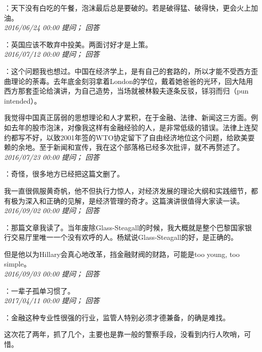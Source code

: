 \documentclass[twocolumn]{ctexart}
\begin{document}
：天下没有白吃的午餐，泡沫最后总是要破的。若是破得猛、破得快，更会火上加油。\\

\textit{\hfill\noindent\small 2016/06/24 00:00 提问； 回答}

：英国应该不敢弃中投美。两面讨好才是上策。\\

\textit{\hfill\noindent\small 2016/07/12 00:00 提问； 回答}

：这个问题我也想过。中国在经济学上，是有自己的套路的，所以才能不受西方歪曲理论的荼毒。去年底金刻羽拿着London的学位，戴着她爸爸的光环，回大陆用西方那套歪论给演讲，为自己造势，当场就被林毅夫逐条反驳，铩羽而归（pun intended）。

我觉得中国真正孱弱的思想理论和人才累积，在于金融、法律、新闻这三方面。例如去年的股市泡沫，对像我这样有金融经验的人，是非常低级的错误。法律上连契约都写不好，以致2001年签的WTO协定留下了自由经济地位这个问题，给欧美耍赖的余地。至于新闻和宣传，我在这个部落格已经多次批评，就不再赘述了。\\

\textit{\hfill\noindent\small 2016/07/23 00:00 提问； 回答}

：奇怪，很多地方已经把这篇文删了。

我一直很佩服黄奇帆，他不但执行力惊人，对经济发展的理论大纲和实践细节，都有极为深入和正确的见解，是经济管理的奇才。这篇演讲很值得大家读一读。\\

\textit{\hfill\noindent\small 2016/09/02 00:00 提问； 回答}

：那篇文章我读了。当年废除Glass-Steagall的时候，我大概就是整个巴黎国家银行交易厅里唯一一个没有欢呼的人。杨斌说Glass-Steagall的好，是正确的。

但是他以为Hillary会真心地改革，挡金融财阀的财路，可能是too young, too simple。\\

\textit{\hfill\noindent\small 2016/09/03 00:00 提问； 回答}

：一辈子孤单习惯了。\\

\textit{\hfill\noindent\small 2017/04/11 00:00 提问； 回答}

：金融这种专业性很强的行业，监管人特别必须才德兼备，的确是难找。

这次花了两年，抓了几个，主要也是靠一般的警察手段，没看到内行人吹哨，可惜。\\
\end{document}
